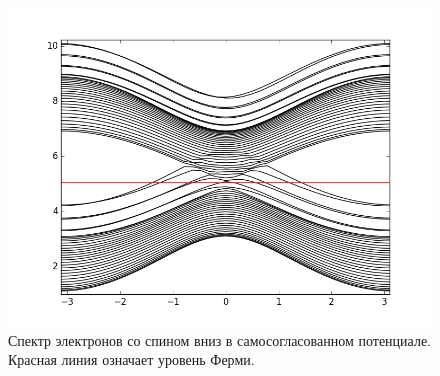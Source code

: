 \begin{figure}
    \centering
    \includegraphics[width=0.8\linewidth]{reconstruction_spectrum_down.png}
    \caption{Спектр электронов со спином вниз в самосогласованном потенциале. Красная 
            линия означает уровень Ферми.}

    \label{fig:spin_down}
\end{figure}
